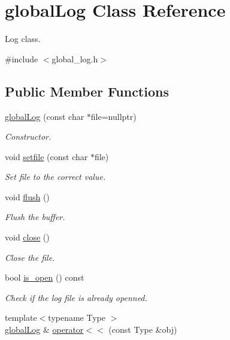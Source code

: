 \hypertarget{classglobal_log}{}\section{global\+Log Class Reference}
\label{classglobal_log}


Log class.  




{\ttfamily \#include $<$global\+\_\+log.\+h$>$}

\subsection*{Public Member Functions}
\begin{DoxyCompactItemize}
\item 
\hyperlink{classglobal_log_a773588391d5e6593678e98b22c30529f}{global\+Log} (const char $\ast$file=nullptr)
\begin{DoxyCompactList}\small\item\em Constructor. \end{DoxyCompactList}\item 
void \hyperlink{classglobal_log_aef6cc5f9b3bec75f838d7721397b9338}{setfile} (const char $\ast$file)
\begin{DoxyCompactList}\small\item\em Set file to the correct value. \end{DoxyCompactList}\item 
void \hyperlink{classglobal_log_a45da7f9fb32a7d4319e3e2255769a24e}{flush} ()
\begin{DoxyCompactList}\small\item\em Flush the buffer. \end{DoxyCompactList}\item 
void \hyperlink{classglobal_log_a9ce3b2370f87b2645c4c50354c4d63fa}{close} ()
\begin{DoxyCompactList}\small\item\em Close the file. \end{DoxyCompactList}\item 
bool \hyperlink{classglobal_log_aa666c04b1c1429ab765c7313060d9e39}{is\+\_\+open} () const
\begin{DoxyCompactList}\small\item\em Check if the log file is already openned. \end{DoxyCompactList}\item 
{\footnotesize template$<$typename Type $>$ }\\\hyperlink{classglobal_log}{global\+Log} \& \hyperlink{classglobal_log_a1a8d6920fb45109bba411cf678e1e502}{operator$<$$<$} (const Type \&obj)

\end{DoxyCompactItemize}
